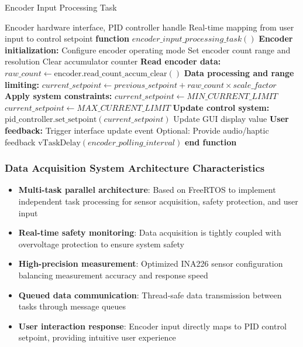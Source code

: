 \documentclass{article}
\begin{document}
\begin{algorithm}
\caption{Encoder Input Processing Task}
\label{alg:encoder_input_processing}
\begin{algorithmic}[1]
\REQUIRE Encoder hardware interface, PID controller handle
\ENSURE Real-time mapping from user input to control setpoint
\STATE \textbf{function} $encoder\_input\_processing\_task()$
\STATE
\STATE \textbf{Encoder initialization:}
\STATE Configure encoder operating mode 
\STATE Set encoder count range and resolution
\STATE Clear accumulator counter
\STATE
{}
    \STATE \textbf{Read encoder data:}
    \STATE $raw\_count \leftarrow \text{encoder.read\_count\_accum\_clear}()$
    \STATE
    \STATE \textbf{Data processing and range limiting:}
    \STATE $current\_setpoint \leftarrow previous\_setpoint + raw\_count \times scale\_factor$
    \STATE
    \STATE \textbf{Apply system constraints:}     
        \STATE $current\_setpoint \leftarrow MIN\_CURRENT\_LIMIT$
     
        \STATE $current\_setpoint \leftarrow MAX\_CURRENT\_LIMIT$
    \ENDIF
    \STATE    \STATE \textbf{Update control system:}
    \STATE $\text{pid\_controller.set\_setpoint}(current\_setpoint)$
    \STATE Update GUI display value
    \STATE    \STATE \textbf{User feedback:}
        \STATE Trigger interface update event
        \STATE Optional: Provide audio/haptic feedback
    \ENDIF
    \STATE
    \STATE $\text{vTaskDelay}(encoder\_polling\_interval)$ 
\ENDWHILE
\STATE \textbf{end function}
\end{algorithmic}
\end{algorithm}

\subsubsection{Data Acquisition System Architecture Characteristics}

\begin{itemize}
    \item \textbf{Multi-task parallel architecture}: Based on FreeRTOS to implement independent task processing for sensor acquisition, safety protection, and user input
    \item \textbf{Real-time safety monitoring}: Data acquisition is tightly coupled with overvoltage protection to ensure system safety
    \item \textbf{High-precision measurement}: Optimized INA226 sensor configuration balancing measurement accuracy and response speed
    \item \textbf{Queued data communication}: Thread-safe data transmission between tasks through message queues
    \item \textbf{User interaction response}: Encoder input directly maps to PID control setpoint, providing intuitive user experience
\end{itemize}
\end{document}
